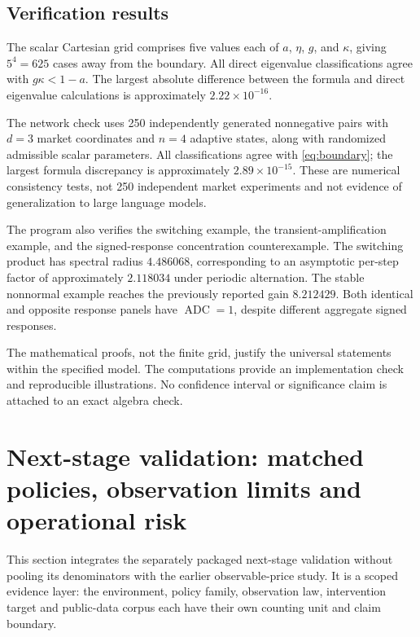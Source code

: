 \documentclass[11pt,a4paper]{article}
\theoremstyle{definition}
\theoremstyle{remark}
\newcommand{\ADC}{\operatorname{ADC}}
\begin{document}
\subsection{Verification results}
The scalar Cartesian grid comprises five values each of $a$, $\eta$, $g$, and $\kappa$, giving $5^4=625$ cases away from the boundary. All direct eigenvalue classifications agree with $g\kappa<1-a$. The largest absolute difference between the formula and direct eigenvalue calculations is approximately $2.22\times10^{-16}$.

The network check uses 250 independently generated nonnegative pairs with $d=3$ market coordinates and $n=4$ adaptive states, along with randomized admissible scalar parameters. All classifications agree with \cref{eq:boundary}; the largest formula discrepancy is approximately $2.89\times10^{-15}$. These are numerical consistency tests, not 250 independent market experiments and not evidence of generalization to large language models.

The program also verifies the switching example, the transient-amplification example, and the signed-response concentration counterexample. The switching product has spectral radius $4.486068$, corresponding to an asymptotic per-step factor of approximately $2.118034$ under periodic alternation. The stable nonnormal example reaches the previously reported gain $8.212429$. Both identical and opposite response panels have $\ADC=1$, despite different aggregate signed responses.

The mathematical proofs, not the finite grid, justify the universal statements within the specified model. The computations provide an implementation check and reproducible illustrations. No confidence interval or significance claim is attached to an exact algebra check.

\section{Next-stage validation: matched policies, observation limits and operational risk}
\label{sec:next_stage}
This section integrates the separately packaged next-stage validation without pooling its denominators with the earlier observable-price study. It is a scoped evidence layer: the environment, policy family, observation law, intervention target and public-data corpus each have their own counting unit and claim boundary.
\end{document}
